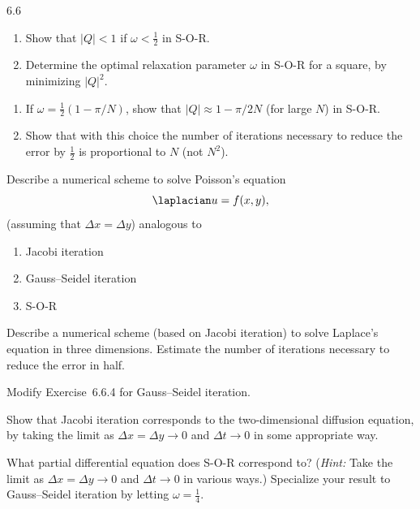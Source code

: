 \begin{exercises}{6.6}
\item
\begin{enumerate}
\item[(a)] Show that $|Q| < 1$ if $\omega < \frac{1}{2}$ in S-O-R.
\item[(b)] Determine the optimal relaxation parameter $\omega$ in S-O-R for a square, by minimizing $|Q|^2$.
\end{enumerate}

\item
\begin{enumerate}
\item[(a)] If $\omega = \frac{1}{2}(1 - \pi/N)$, show that $|Q| \approx 1 - \pi/2N$ (for large $N$) in S-O-R.
\item[(b)] Show that with this choice the number of iterations necessary to reduce the error by $\frac{1}{2}$ is proportional to $N$ (not $N^2$).
\end{enumerate}

\item Describe a numerical scheme to solve Poisson's equation
\[
\laplacian u = f(x,y),
\]
(assuming that $\Delta x = \Delta y$) analogous to
\begin{enumerate}
\item[(a)] Jacobi iteration
\item[(b)] Gauss--Seidel iteration
\item[(c)] S-O-R
\end{enumerate}

\item Describe a numerical scheme (based on Jacobi iteration) to solve Laplace's equation in three dimensions.  Estimate the number of iterations necessary to reduce the error in half.

\item Modify Exercise~6.6.4 for Gauss--Seidel iteration.

\item Show that Jacobi iteration corresponds to the two-dimensional diffusion equation, by taking the limit as $\Delta x = \Delta y \to 0$ and $\Delta t \to 0$ in some appropriate way.

\item What partial differential equation does S-O-R correspond to?  (\emph{Hint:} Take the limit as $\Delta x = \Delta y \to 0$ and $\Delta t \to 0$ in various ways.)  Specialize your result to Gauss--Seidel iteration by letting $\omega = \frac{1}{4}$.


\end{exercises}
